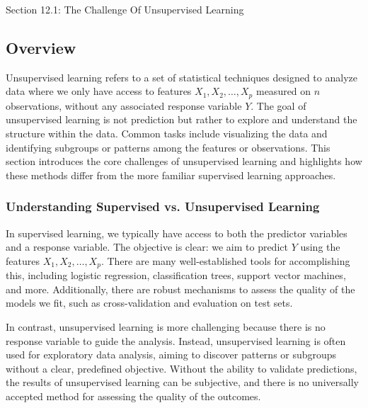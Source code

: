 \begin{notes}{Section 12.1: The Challenge Of Unsupervised Learning}
    \subsection*{Overview}

    Unsupervised learning refers to a set of statistical techniques designed to analyze data where we only have access to features \(X_1, X_2, \dots, X_p\) measured on \(n\) observations, without any associated 
    response variable \(Y\). The goal of unsupervised learning is not prediction but rather to explore and understand the structure within the data. Common tasks include visualizing the data and identifying 
    subgroups or patterns among the features or observations. This section introduces the core challenges of unsupervised learning and highlights how these methods differ from the more familiar supervised 
    learning approaches.
    
    \subsubsection*{Understanding Supervised vs. Unsupervised Learning}
    
    In supervised learning, we typically have access to both the predictor variables and a response variable. The objective is clear: we aim to predict \(Y\) using the features \(X_1, X_2, \dots, X_p\). There 
    are many well-established tools for accomplishing this, including logistic regression, classification trees, support vector machines, and more. Additionally, there are robust mechanisms to assess the quality 
    of the models we fit, such as cross-validation and evaluation on test sets.
    
    In contrast, unsupervised learning is more challenging because there is no response variable to guide the analysis. Instead, unsupervised learning is often used for exploratory data analysis, aiming to discover 
    patterns or subgroups without a clear, predefined objective. Without the ability to validate predictions, the results of unsupervised learning can be subjective, and there is no universally accepted method for 
    assessing the quality of the outcomes.
    

\end{notes}
